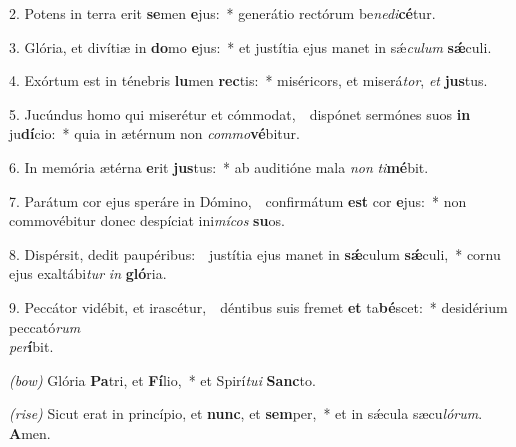 2. Potens in terra erit \textbf{se}men \textbf{e}jus:~* generátio rectórum be\textit{ne}\textit{di}\textbf{cé}tur.

3. Glória, et divítiæ in \textbf{do}mo \textbf{e}jus:~* et justítia ejus manet in s\'{\ae}\textit{cu}\textit{lum} \textbf{s\'{\ae}}culi.

4. Exórtum est in ténebris \textbf{lu}men \textbf{rec}tis:~* miséricors, et miserá\textit{tor}, \textit{et} \textbf{jus}tus.

5. Jucúndus homo qui miserétur et cómmodat,~{\color{red}\GreDagger}\ dispónet sermónes suos \textbf{in} ju\textbf{dí}cio:~* quia in ætérnum non \textit{com}\textit{mo}\textbf{vé}bitur.

6. In memória ætérna \textbf{e}rit \textbf{jus}tus:~* ab auditióne mala \textit{non} \textit{ti}\textbf{mé}bit.

7. Parátum cor ejus speráre in Dómino,~{\color{red}\GreDagger}\ confirmátum \textbf{est} cor \textbf{e}jus:~* non commovébitur donec despíciat ini\textit{mí}\textit{cos} \textbf{su}os.

8. Dispérsit, dedit paupéribus:~{\color{red}\GreDagger}\ justítia ejus manet in \textbf{s\'{\ae}}culum \textbf{s\'{\ae}}culi,~* cornu ejus exaltábi\textit{tur} \textit{in} \textbf{gló}ria.

9. Peccátor vidébit, et irascétur,~{\color{red}\GreDagger}\ déntibus suis fremet \textbf{et} ta\textbf{bé}scet:~* desidérium peccató\textit{rum}\\ \textit{per}\textbf{í}bit.

{\color{red}\textit{(bow)}} Glória \textbf{Pa}tri, et \textbf{Fí}lio,~* et Spirí\textit{tu}\textit{i} \textbf{Sanc}to.

{\color{red}\textit{(rise)}} Sicut erat in princípio, et \textbf{nunc}, et \textbf{sem}per,~* et in s\'{\ae}cula sæcu\textit{ló}\textit{rum}. \textbf{A}men.
